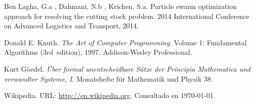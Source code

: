 \documentclass[a4paper,10pt,twocolumn]{article}
\begin{document}
\begin{thebibliography}{99}
	 Ben Lagha, G.a , Dahmani, N.b , Krichen, S.a.
	Particle swarm optimization approach for resolving the
	cutting stock problem. 2014 International Conference
	on Advanced Logistics and Transport, 2014.
	
	
	
	 Donald E. Knuth. \emph{The Art of Computer Programming}.
		Volume 1: Fundamental Algorithms (3rd~edition), 1997.
		Addison-Wesley Professional.

	 Kurt Göedel. \emph{Über formal unentscheidbare Sätze der
		Principia Mathematica und verwandter Systeme, I}.
		Monatshefte für Mathematik und Physik 38.

	 Wikipedia. URL: \href{http://en.wikipedia.org}
	  {http://en.wikipedia.org}.
		Consultado en \today.

\end{thebibliography}


\label{end}
\end{document}
